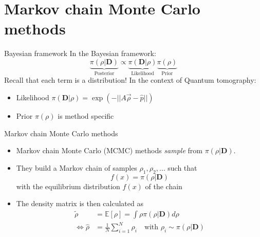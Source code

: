 \documentclass{beamer}
\newcommand{\mb}{\mathbf}
\begin{document}
\section{Markov chain Monte Carlo methods}
\begin{frame}{Bayesian framework}
    In the Bayesian framework:
    \begin{equation}
        \underbrace{\pi (\rho|\mb D)}_{\text{Posterior}} \propto \underbrace{\pi(\mb D|\rho)}_{\text{Likelihood}} \underbrace{\pi(\rho)}_{\text{Prior}}
    \end{equation}
    Recall that each term is a distribution!\medbreak
    In the context of Quantum tomography:
    \begin{itemize}
        \item Likelihood $\pi(\mb D|\rho) = \exp(-||A \vec\rho - \hat p||)$
        \item Prior $\pi(\rho)$ is method specific
    \end{itemize}
\end{frame}
\begin{frame}{Markov chain Monte Carlo methods}
    \begin{itemize}
        \item Markov chain Monte Carlo (MCMC) methods \textit{sample} from $\pi (\rho|\mb D)$.
        \item They build a Markov chain of samples $\rho_1, \rho_2, \dots$ such that
        \begin{equation}
            f(x) =\pi (\rho|\mb D)
        \end{equation}
        with the equilibrium distribution $f(x)$ of the chain
        \item The density matrix is then calculated as
        \begin{align}
            \tilde \rho &= \mathbb{E}[\rho]= \int \rho \pi(\rho|\mb D) d\rho\\
            \Leftrightarrow \hat \rho &= \frac{1}{N}\sum_{i=1}^N \rho_i \quad \text{with } \rho_i \sim \pi(\rho|\mb D)
        \end{align}
            
    \end{itemize}
\end{frame}
\end{document}
